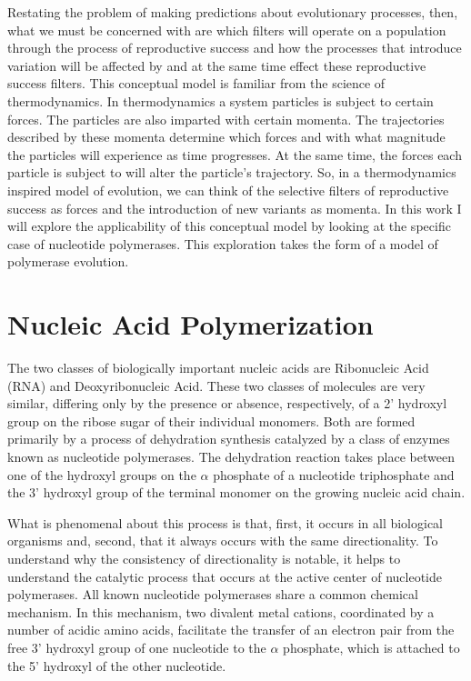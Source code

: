 Restating the problem of making predictions about evolutionary processes, then, what we must be concerned with are which filters will operate on a population through the process of reproductive success and how the processes that introduce variation will be affected by and at the same time effect these reproductive success filters. This conceptual model is familiar from the science of thermodynamics. In thermodynamics a system particles is subject to certain forces. The particles are also imparted with certain momenta. The trajectories described by these momenta determine which forces and with what magnitude the particles will experience as time progresses. At the same time, the forces each particle is subject to will alter the particle's trajectory. So, in a thermodynamics inspired model of evolution, we can think of the selective filters of reproductive success as forces and the introduction of new variants as momenta. In this work I will explore the applicability of this conceptual model by looking at the specific case of nucleotide polymerases. This exploration takes the form of a model of polymerase evolution.

\section*{Nucleic Acid Polymerization} %
\label{sec:nucleotide_polymerization}
The two classes of biologically important nucleic acids are Ribonucleic Acid (RNA) and Deoxyribonucleic Acid. These two classes of molecules are very similar, differing only by the presence or absence, respectively, of a 2' hydroxyl group on the ribose sugar of their individual monomers. Both are formed primarily by a process of dehydration synthesis catalyzed by a class of enzymes known as nucleotide polymerases. The dehydration reaction takes place between one of the hydroxyl groups on the $\alpha$ phosphate of a nucleotide triphosphate and the 3' hydroxyl group of the terminal monomer on the growing nucleic acid chain.

What is phenomenal about this process is that, first, it occurs in all biological organisms and, second, that it always occurs with the same directionality. To understand why the consistency of directionality is notable, it helps to understand the catalytic process that occurs at the active center of nucleotide polymerases. All known nucleotide polymerases share a common chemical mechanism. In this mechanism, two divalent metal cations, coordinated by a number of acidic amino acids, facilitate the transfer of an electron pair from the free 3' hydroxyl group of one nucleotide to the $\alpha$ phosphate, which is attached to the 5' hydroxyl of the other nucleotide.

